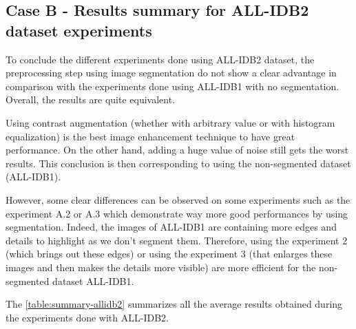 \documentclass[11pt, openany]{report}
\theoremstyle{plain}
\theoremstyle{definition}
\theoremstyle{remark}
\begin{document}
\newpage
\subsection{Case B - Results summary for ALL-IDB2 dataset experiments}


\vspace{0.5cm}


To conclude the different experiments done using ALL-IDB2 dataset, the preprocessing step using image segmentation do not show a clear advantage in comparison with the experiments done using ALL-IDB1 with no segmentation. Overall, the results are quite equivalent. 

Using contrast augmentation (whether with arbitrary value or with histogram equalization) is the best image enhancement technique to have great performance. On the other hand, adding a huge value of noise still gets the worst results. This conclusion is then corresponding to using the non-segmented dataset (ALL-IDB1). 

However, some clear differences can be observed on some experiments such as the experiment A.2 or A.3 which demonstrate way more good performances by using segmentation. Indeed, the images of ALL-IDB1 are containing more edges and details to highlight as we don't segment them. Therefore, using the experiment 2 (which brings out these edges) or using the experiment 3 (that enlarges these images and then makes the details more visible) are more efficient for the non-segmented dataset ALL-IDB1. 

The \autoref{table:summary-allidb2} summarizes all the average results obtained during the experiments done with ALL-IDB2. 
\end{document}
